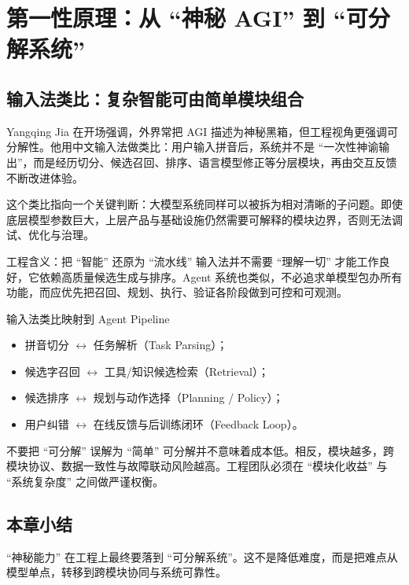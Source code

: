 \section{第一性原理：从 ``神秘 AGI'' 到 ``可分解系统''}

\subsection{输入法类比：复杂智能可由简单模块组合}
Yangqing Jia 在开场强调，外界常把 AGI 描述为神秘黑箱，但工程视角更强调可分解性。他用中文输入法做类比：用户输入拼音后，系统并不是 ``一次性神谕输出''，而是经历切分、候选召回、排序、语言模型修正等分层模块，再由交互反馈不断改进体验。

这个类比指向一个关键判断：大模型系统同样可以被拆为相对清晰的子问题。即使底层模型参数巨大，上层产品与基础设施仍然需要可解释的模块边界，否则无法调试、优化与治理。

\begin{importantbox}{工程含义：把 ``智能'' 还原为 ``流水线''}
输入法并不需要 ``理解一切'' 才能工作良好，它依赖高质量候选生成与排序。Agent 系统也类似，不必追求单模型包办所有功能，而应优先把召回、规划、执行、验证各阶段做到可控和可观测。
\end{importantbox}

\begin{knowledgebox}{输入法类比映射到 Agent Pipeline}
\begin{itemize}
    \item 拼音切分 $\leftrightarrow$ 任务解析（Task Parsing）；
    \item 候选字召回 $\leftrightarrow$ 工具/知识候选检索（Retrieval）；
    \item 候选排序 $\leftrightarrow$ 规划与动作选择（Planning / Policy）；
    \item 用户纠错 $\leftrightarrow$ 在线反馈与后训练闭环（Feedback Loop）。
\end{itemize}
\end{knowledgebox}

\begin{warningbox}{不要把 ``可分解'' 误解为 ``简单''}
可分解并不意味着成本低。相反，模块越多，跨模块协议、数据一致性与故障联动风险越高。工程团队必须在 ``模块化收益'' 与 ``系统复杂度'' 之间做严谨权衡。
\end{warningbox}

\subsection{本章小结}
``神秘能力'' 在工程上最终要落到 ``可分解系统''。这不是降低难度，而是把难点从模型单点，转移到跨模块协同与系统可靠性。

